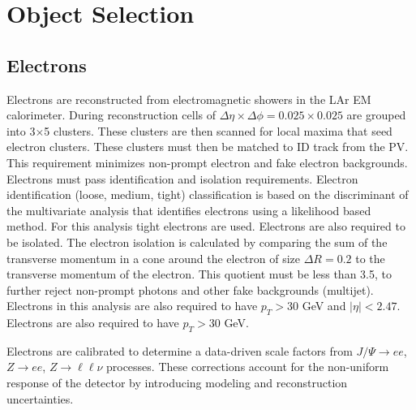 \section{Object Selection} 
\subsection{Electrons}
Electrons are reconstructed from electromagnetic showers in the LAr EM calorimeter. During reconstruction cells of $\Delta \eta \times \Delta \phi = 0.025 \times 0.025 $ are grouped into 3$\times$5 clusters. These clusters are then scanned for local maxima that seed electron clusters. These clusters must then be matched to ID track from the PV. This requirement minimizes non-prompt electron and fake electron backgrounds. Electrons must pass identification and isolation requirements. Electron identification (loose, medium, tight) classification is based on the discriminant of the multivariate analysis that identifies electrons using a likelihood based method. For this analysis tight electrons are used. Electrons are also required to be isolated. The electron isolation is calculated by comparing the sum of the transverse momentum in a cone around the electron of size $\Delta R = 0.2$ to the transverse momentum of the electron. This quotient must be less than 3.5, to further reject non-prompt photons and other fake backgrounds (multijet). Electrons in this analysis are also required to have $p_{T} > 30$ GeV and $|\eta| < 2.47$. Electrons are also required to have $p_{T} > 30$ GeV.

Electrons are calibrated to determine a data-driven scale factors from $J/ \Psi \rightarrow ee$, $Z \rightarrow ee$, $Z \rightarrow \ell \ell \nu$ processes. These corrections account for the  non-uniform response of the detector by introducing modeling and reconstruction uncertainties. 

